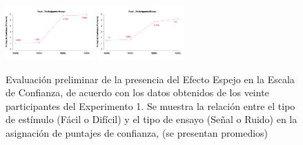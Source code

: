 \begin{figure}[th]
\includegraphics[width=0.30\textwidth]{Figures/MirrorRating_Exp1_P19} \includegraphics[width=0.30\textwidth]{Figures/MirrorRating_Exp1_P20} 
\caption[Puntaje de confianza promedio por tipo de estímulo (A-B) y tipo de ensayo (S-N); Experimento 1]{Evaluación preliminar de la presencia del Efecto Espejo en la Escala de Confianza, de acuerdo con los datos obtenidos de los veinte participantes del Experimento 1. Se muestra la relación entre el tipo de estímulo (Fácil o Difícil) y el tipo de ensayo (Señal o Ruido) en la asignación de puntajes de confianza, (se presentan promedios)}
\label{fig:MERating_E1}
\end{figure}

